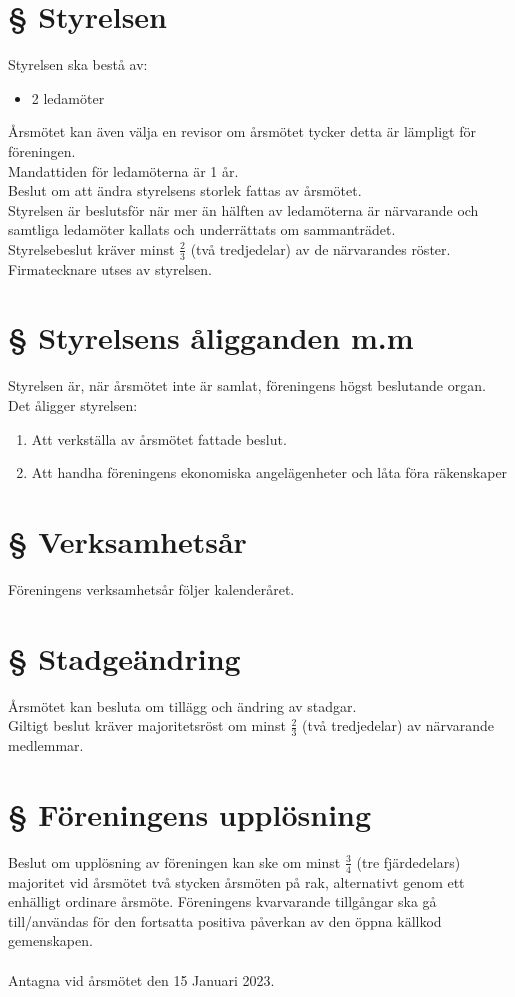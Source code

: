 \documentclass{article}
\begin{document}
\section{§ Styrelsen}
Styrelsen ska bestå av:
\begin{itemize}
    \item 2 ledamöter
\end{itemize}
Årsmötet kan även välja en revisor om årsmötet tycker detta är lämpligt för föreningen.\\
Mandattiden för ledamöterna är 1 år.\\
Beslut om att ändra styrelsens storlek fattas av årsmötet.\\
Styrelsen är beslutsför när mer än hälften av ledamöterna är närvarande och samtliga ledamöter kallats och underrättats om sammanträdet.\\
Styrelsebeslut kräver minst $\frac{2}{3}$ (två tredjedelar) av de närvarandes röster.\\
Firmatecknare utses av styrelsen.
\section{§ Styrelsens åligganden m.m}
Styrelsen är, när årsmötet inte är samlat, föreningens högst beslutande organ.
Det åligger styrelsen:
\begin{enumerate}
  \item Att verkställa av årsmötet fattade beslut.
  \item Att handha föreningens ekonomiska angelägenheter och låta föra räkenskaper
\end{enumerate}
\section{§ Verksamhetsår}
Föreningens verksamhetsår följer kalenderåret.
\section{§ Stadgeändring}
Årsmötet kan besluta om tillägg och ändring av stadgar.\\
Giltigt beslut kräver majoritetsröst om minst $\frac{2}{3}$ (två tredjedelar) av närvarande medlemmar.
\newpage
\section{§ Föreningens upplösning}
Beslut om upplösning av föreningen kan ske om minst $\frac{3}{4}$ (tre fjärdedelars) majoritet vid årsmötet två stycken årsmöten på rak, alternativt genom ett enhälligt ordinare årsmöte. Föreningens kvarvarande tillgångar ska gå till/användas för den fortsatta positiva påverkan av den öppna källkod gemenskapen.\\\\

Antagna vid årsmötet den 15 Januari 2023.
\end{document}
